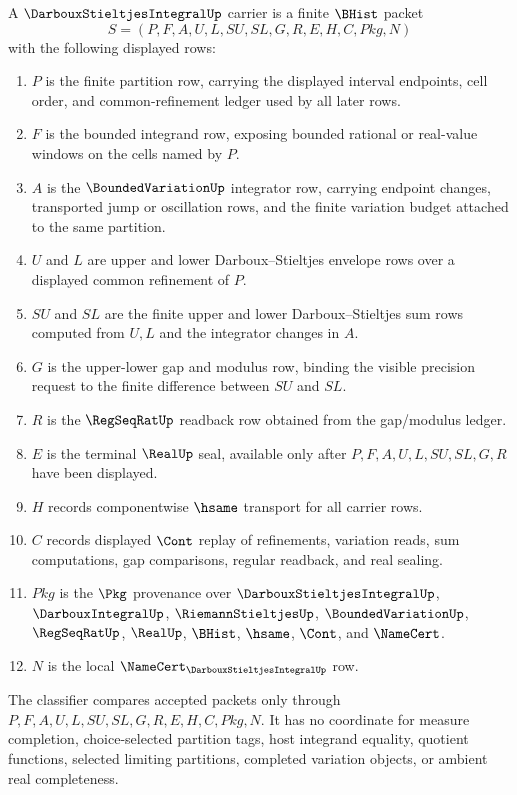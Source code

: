 \begin{definition}
\label{def:darboux-stieltjes-integral-carrier}
A $\DarbouxStieltjesIntegralUp$ carrier is a finite $\BHist$ packet
$$
S=(P,F,A,U,L,SU,SL,G,R,E,H,C,Pkg,N)
$$
with the following displayed rows:
\begin{enumerate}
\item $P$ is the finite partition row, carrying the displayed interval endpoints, cell order, and common-refinement ledger used by all later rows.
\item $F$ is the bounded integrand row, exposing bounded rational or real-value windows on the cells named by $P$.
\item $A$ is the $\BoundedVariationUp$ integrator row, carrying endpoint changes, transported jump or oscillation rows, and the finite variation budget attached to the same partition.
\item $U$ and $L$ are upper and lower Darboux--Stieltjes envelope rows over a displayed common refinement of $P$.
\item $SU$ and $SL$ are the finite upper and lower Darboux--Stieltjes sum rows computed from $U,L$ and the integrator changes in $A$.
\item $G$ is the upper-lower gap and modulus row, binding the visible precision request to the finite difference between $SU$ and $SL$.
\item $R$ is the $\RegSeqRatUp$ readback row obtained from the gap/modulus ledger.
\item $E$ is the terminal $\RealUp$ seal, available only after $P,F,A,U,L,SU,SL,G,R$ have been displayed.
\item $H$ records componentwise $\hsame$ transport for all carrier rows.
\item $C$ records displayed $\Cont$ replay of refinements, variation reads, sum computations, gap comparisons, regular readback, and real sealing.
\item $Pkg$ is the $\Pkg$ provenance over $\DarbouxStieltjesIntegralUp$, $\DarbouxIntegralUp$, $\RiemannStieltjesUp$, $\BoundedVariationUp$, $\RegSeqRatUp$, $\RealUp$, $\BHist$, $\hsame$, $\Cont$, and $\NameCert$.
\item $N$ is the local $\NameCert_{\DarbouxStieltjesIntegralUp}$ row.
\end{enumerate}
The classifier compares accepted packets only through $P,F,A,U,L,SU,SL,G,R,E,H,C,Pkg,N$. It has no coordinate for measure completion, choice-selected partition tags, host integrand equality, quotient functions, selected limiting partitions, completed variation objects, or ambient real completeness.
\end{definition}

